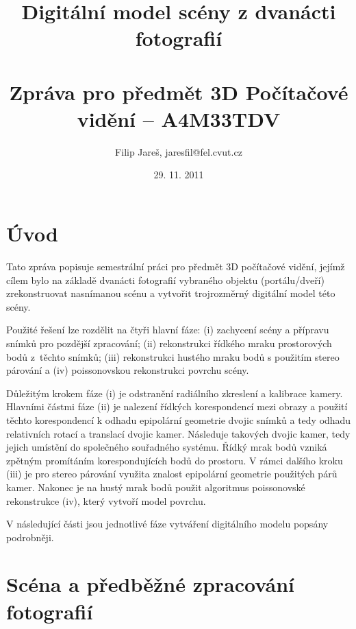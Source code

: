 \documentclass[11pt,oneside,a4paper,pdftex]{article}   %
\title{Digitální model scény z dvanácti fotografií \\ \ \\ \large Zpráva pro předmět 3D Počítačové vidění -- A4M33TDV}
\date{29. 11. 2011}
\author{Filip Jareš, jaresfil@fel.cvut.cz}
\begin{document}
\maketitle

\section{Úvod}

Tato zpráva popisuje semestrální práci pro předmět 3D počítačové vidění, jejímž cílem bylo na základě
dvanácti fotografií vybraného objektu (portálu/dveří) zrekonstruovat nasnímanou scénu a vytvořit
trojrozměrný digitální model této scény.

Použité řešení lze rozdělit na čtyři hlavní fáze: (i) zachycení scény a přípravu snímků pro pozdější
zpracování; (ii) rekonstrukci řídkého mraku prostorových bodů z~těchto snímků; (iii) rekonstrukci hustého
mraku bodů s použitím stereo párování a (iv) poissonovskou rekonstrukci povrchu scény.


Důležitým krokem fáze (i) je odstranění radiálního zkreslení a kalibrace kamery. Hlavními částmi fáze
(ii) je nalezení řídkých korespondencí mezi obrazy a použití těchto korespondencí k odhadu epipolární
geometrie dvojic snímků a tedy odhadu relativních rotací a translací dvojic kamer.  Následuje
 takových dvojic kamer, tedy jejich umístění do společného souřadného systému. Řídký mrak
bodů vzniká zpětným promítáním korespondujících bodů do prostoru. V rámci dalšího kroku (iii)
je pro stereo párování využita znalost epipolární geometrie použitých párů kamer. Nakonec je na hustý
mrak bodů použit algoritmus poissonovské rekonstrukce (iv), který vytvoří model povrchu.

V následující části jsou jednotlivé fáze vytváření digitálního modelu popsány podrobněji.

\section{Scéna a předběžné zpracování fotografií}
\end{document}
